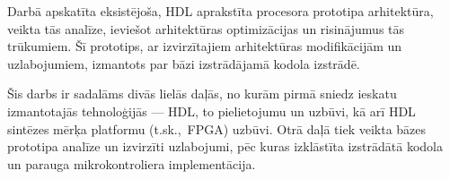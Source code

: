 Darbā apskatīta eksistējoša, HDL aprakstīta procesora prototipa arhitektūra,
veikta tās analīze, ieviešot arhitektūras optimizācijas un risinājumus tās
trūkumiem. Šī prototips, ar izvirzītajiem arhitektūras modifikācijām un 
uzlabojumiem, izmantots par bāzi izstrādājamā kodola izstrādē.


Šis darbs ir sadalāms divās lielās daļās, no kurām pirmā sniedz ieskatu
izmantotajās tehnoloģijās --- HDL, to pielietojumu un uzbūvi, kā arī HDL
sintēzes mērķa platformu (t.sk.,~FPGA) uzbūvi. Otrā daļā tiek veikta bāzes
prototipa analīze un izvirzīti uzlabojumi, pēc kuras izklāstīta izstrādātā
kodola un parauga mikrokontroliera implementācija.

